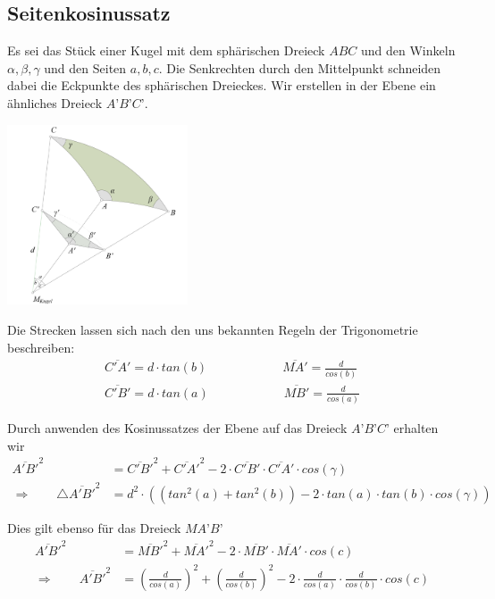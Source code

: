 \begin{refsection}
\subsection{Seitenkosinussatz}
Es sei das Stück einer Kugel mit dem sphärischen Dreieck $ABC$ und den Winkeln $\alpha, \beta, \gamma$ und den Seiten $a, b, c$. Die Senkrechten durch den Mittelpunkt schneiden dabei die Eckpunkte des sphärischen Dreieckes. Wir erstellen in der Ebene ein ähnliches Dreieck $A’B’C’$.

\begin{center}
        \includegraphics[width=0.4\textwidth]{kugel/Seitenkosinus.jpg}
\end{center}

Die Strecken lassen sich nach den uns bekannten Regeln der Trigonometrie beschreiben:
\begin{align*}
\overline{C'A'} = d\cdot {tan(b)} \quad \quad \quad \quad \quad \quad 
\overline{MA'} = \frac{ d }{cos(b)} \\
\overline{C'B'} = d\cdot {tan(a)} \quad \quad \quad \quad \quad \quad 
\overline{MB'} = \frac{ d }{cos(a)}
\end{align*} 


Durch anwenden des Kosinussatzes der Ebene auf das Dreieck $A’B’C’$ erhalten wir
\begin{align}
\overline{A'B'}^{ 2 } &= \overline{ C'B' }^{ 2 } + \overline{ C'A' }^{ 2 } - 2 \cdot \overline{C'B'} \cdot \overline{ C'A' } \cdot cos(\gamma) \nonumber \\ 
\Rightarrow \quad \quad
\triangle \overline{A'B'}^{ 2 } &= d^{ 2 } \cdot \left(\left(tan^{ 2 }(a) + tan^{ 2 }(b)\right) - 2\cdot tan(a) \cdot tan(b) \cdot cos(\gamma)\right) 
\label {V3} 
\end{align}

Dies gilt ebenso für das Dreieck $MA’B’$
\begin{align*}
\overline{A'B'}^{2} &= \overline{MB'}^{2} + \overline{MA'}^{2} - 2\cdot \overline{MB'} \cdot \overline{MA'} \cdot cos(c) \\
\Rightarrow \quad \quad
\overline{A'B'}^{ 2 } &= \left(\frac{ d }{ cos(a) }  \right)^{ 2 } + \left(\frac{ d }{ cos(b)}  \right)^{ 2 } - 2 \cdot \frac{ d }{ cos(a)} \cdot \frac{ d }{ cos(b)} \cdot cos(c) 
\end{align*}


\end{refsection}
